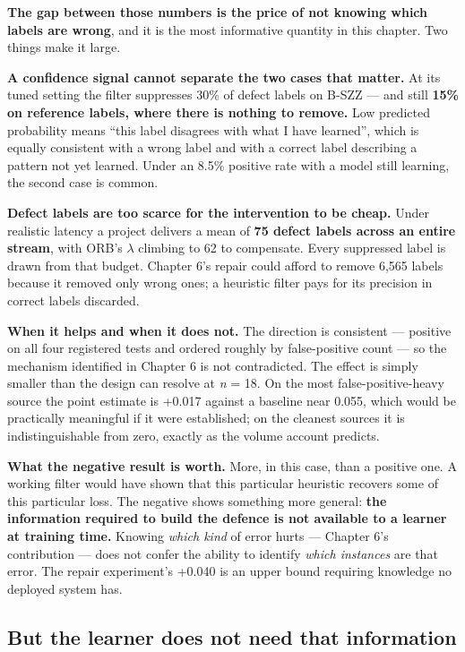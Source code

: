 \textbf{The gap between those numbers is the price of not knowing which
labels are wrong}, and it is the most informative quantity in this
chapter. Two things make it large.

\textbf{A confidence signal cannot separate the two cases that matter.}
At its tuned setting the filter suppresses 30\% of defect labels on
B-SZZ --- and still \textbf{15\% on reference labels, where there is
nothing to remove.} Low predicted probability means ``this label
disagrees with what I have learned'', which is equally consistent with a
wrong label and with a correct label describing a pattern not yet
learned. Under an 8.5\% positive rate with a model still learning, the
second case is common.

\textbf{Defect labels are too scarce for the intervention to be cheap.}
Under realistic latency a project delivers a mean of \textbf{75 defect
labels across an entire stream}, with ORB's \ensuremath{\lambda} climbing to 62 to
compensate. Every suppressed label is drawn from that budget. Chapter
6's repair could afford to remove 6,565 labels because it removed only
wrong ones; a heuristic filter pays for its precision in correct labels
discarded.

\textbf{When it helps and when it does not.} The direction is consistent
--- positive on all four registered tests and ordered roughly by
false-positive count --- so the mechanism identified in Chapter 6 is not
contradicted. The effect is simply smaller than the design can resolve
at \emph{n} = 18. On the most false-positive-heavy source the point
estimate is +0.017 against a baseline near 0.055, which would be
practically meaningful if it were established; on the cleanest sources
it is indistinguishable from zero, exactly as the volume account
predicts.

\textbf{What the negative result is worth.} More, in this case, than a
positive one. A working filter would have shown that this particular
heuristic recovers some of this particular loss. The negative shows
something more general: \textbf{the information required to build the
defence is not available to a learner at training time.} Knowing
\emph{which kind} of error hurts --- Chapter 6's contribution --- does
not confer the ability to identify \emph{which instances} are that
error. The repair experiment's +0.040 is an upper bound requiring
knowledge no deployed system has.

\subsection{But the learner does not need that
information}\label{but-the-learner-does-not-need-that-information}

